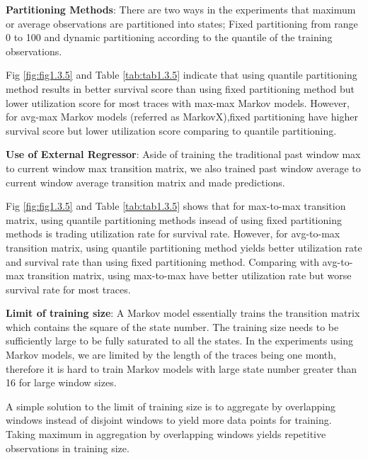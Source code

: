 \documentclass{article}
\begin{document}
\begin{flushleft}
\textbf{Partitioning Methods}: There are two ways in the experiments that maximum or average observations are partitioned into states; Fixed partitioning from range 0 to 100 and dynamic partitioning according to the quantile of the training observations. 

Fig \ref{fig:fig1.3.5} and Table \ref{tab:tab1.3.5} indicate that using quantile partitioning method results in better survival score than using fixed partitioning method but lower utilization score for most traces with max-max Markov models. However, for avg-max Markov models (referred as MarkovX),fixed partitioning have higher survival score but lower utilization score comparing to quantile partitioning.
\end{flushleft}

\begin{flushleft}
\textbf{Use of External Regressor}: Aside of training the traditional past window max to current window max transition matrix, we also trained past window average to current window average transition matrix and made predictions. 

Fig \ref{fig:fig1.3.5} and Table \ref{tab:tab1.3.5} shows that for max-to-max transition matrix, using quantile partitioning methods insead of using fixed partitioning methods is trading utilization rate for survival rate. However, for avg-to-max transition matrix, using quantile partitioning method yields better utilization rate and survival rate than using fixed partitioning method. Comparing with avg-to-max transition matrix, using max-to-max have better utilization rate but worse survival rate for most traces.
\end{flushleft}

\begin{flushleft}
\textbf{Limit of training size}: A Markov model essentially trains the transition matrix which contains the square of the state number. The training size needs to be sufficiently large to be fully saturated to all the states. In the experiments using Markov models, we are limited by the length of the traces being one month, therefore it is hard to train Markov models with large state number greater than 16 for large window sizes.

A simple solution to the limit of training size is to aggregate by overlapping windows instead of disjoint windows to yield more data points for training. Taking maximum in aggregation by overlapping windows yields repetitive observations in training size.
\end{flushleft}
\end{document}
